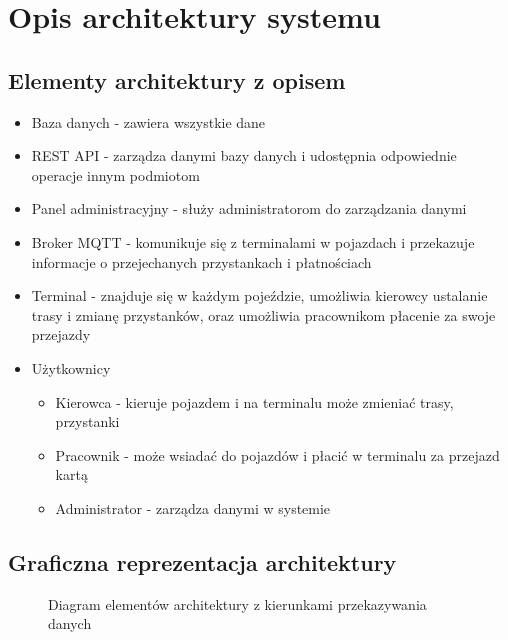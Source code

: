 \section{Opis architektury systemu}
\subsection{Elementy architektury z opisem}
\begin{itemize}
  \item{Baza danych - zawiera wszystkie dane}
  \item{REST API - zarządza danymi bazy danych i udostępnia odpowiednie operacje innym podmiotom}
  \item{Panel administracyjny - służy administratorom do zarządzania danymi}
  \item{Broker MQTT - komunikuje się z terminalami w pojazdach i przekazuje informacje o przejechanych przystankach i płatnościach}
  \item{Terminal - znajduje się w każdym pojeździe, umożliwia kierowcy ustalanie trasy i zmianę przystanków, oraz umożliwia pracownikom płacenie za swoje przejazdy}
  \item{
    Użytkownicy
    \begin{itemize}
      \item{Kierowca - kieruje pojazdem i na terminalu może zmieniać trasy, przystanki}
      \item{Pracownik - może wsiadać do pojazdów i płacić w terminalu za przejazd kartą}
      \item{Administrator - zarządza danymi w systemie}
    \end{itemize}
  }
\end{itemize}
\subsection{Graficzna reprezentacja architektury}
\begin{figure}[H]
  \centering
  \caption{Diagram elementów architektury z kierunkami przekazywania danych}
\end{figure}
